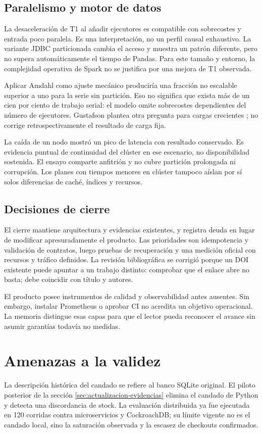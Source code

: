 \documentclass[12pt,a4paper]{article}
\newcommand{\seccion}[1]{\section{#1}}
\begin{document}
\subsection{Paralelismo y motor de datos}
La desaceleración de T1 al añadir ejecutores es compatible con sobrecostes y entrada poco paralela. Es una interpretación, no un perfil causal exhaustivo. La variante JDBC particionada cambia el acceso y muestra un patrón diferente, pero no supera automáticamente el tiempo de Pandas. Para este tamaño y entorno, la complejidad operativa de Spark no se justifica por una mejora de T1 observada.

Aplicar Amdahl como ajuste mecánico produciría una fracción no escalable superior a uno para la serie sin partición. Eso no significa que exista más de un cien por ciento de trabajo serial: el modelo omite sobrecostes dependientes del número de ejecutores. Gustafson plantea otra pregunta para cargas crecientes \cite{gustafson1988reevaluating}; no corrige retrospectivamente el resultado de carga fija.

La caída de un nodo mostró un pico de latencia con resultado conservado. Es evidencia puntual de continuidad del clúster en ese escenario, no disponibilidad sostenida. El ensayo comparte anfitrión y no cubre partición prolongada ni corrupción. Los planes con tiempos menores en clúster tampoco aíslan por sí solos diferencias de caché, índices y recursos.

\subsection{Decisiones de cierre}
El cierre mantiene arquitectura y evidencias existentes, y registra deuda en lugar de modificar apresuradamente el producto. Las prioridades son idempotencia y validación de contratos, luego pruebas de recuperación y una medición oficial con recursos y tráfico definidos. La revisión bibliográfica se corrigió porque un DOI existente puede apuntar a un trabajo distinto: comprobar que el enlace abre no basta; debe coincidir con título y autores.

El producto posee instrumentos de calidad y observabilidad antes ausentes. Sin embargo, instalar Prometheus o aprobar CI no acredita un objetivo operacional. La memoria distingue esas capas para que el lector pueda reconocer el avance sin asumir garantías todavía no medidas.

\seccion{Amenazas a la validez}
La descripción histórica del candado se refiere al banco SQLite original. El piloto posterior de la sección \ref{sec:actualizacion-evidencias} elimina el candado de Python y detecta una discordancia de stock. La evaluación distribuida ya fue ejecutada en 120 corridas contra microservicios y CockroachDB; su límite vigente no es el candado local, sino la saturación observada y la escasez de checkouts confirmados.
\end{document}
